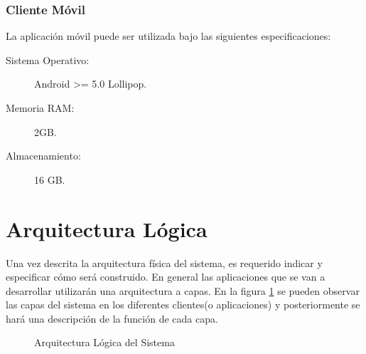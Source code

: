\subsubsection{Cliente Móvil}
La aplicación móvil puede ser utilizada bajo las siguientes especificaciones:
	\begin{description}
		\item[Sistema Operativo:] Android >= 5.0 Lollipop.
		\item[Memoria RAM:] 2GB.
		\item[Almacenamiento:] 16 GB.
	\end{description}


\section{Arquitectura Lógica}
Una vez descrita la arquitectura física del sistema, es requerido indicar y especificar cómo será construido. En general las aplicaciones que se van a desarrollar utilizarán una arquitectura a capas. En la figura \ref{fig:arqLogica} se pueden observar las capas del sistema en los diferentes clientes(o aplicaciones) y posteriormente se hará una descripción de la función de cada capa.

\begin{figure}[hbtp!]
	\begin{center}
		\caption{Arquitectura Lógica del Sistema}
		\label{fig:arqLogica}
	\end{center}
\end{figure}

